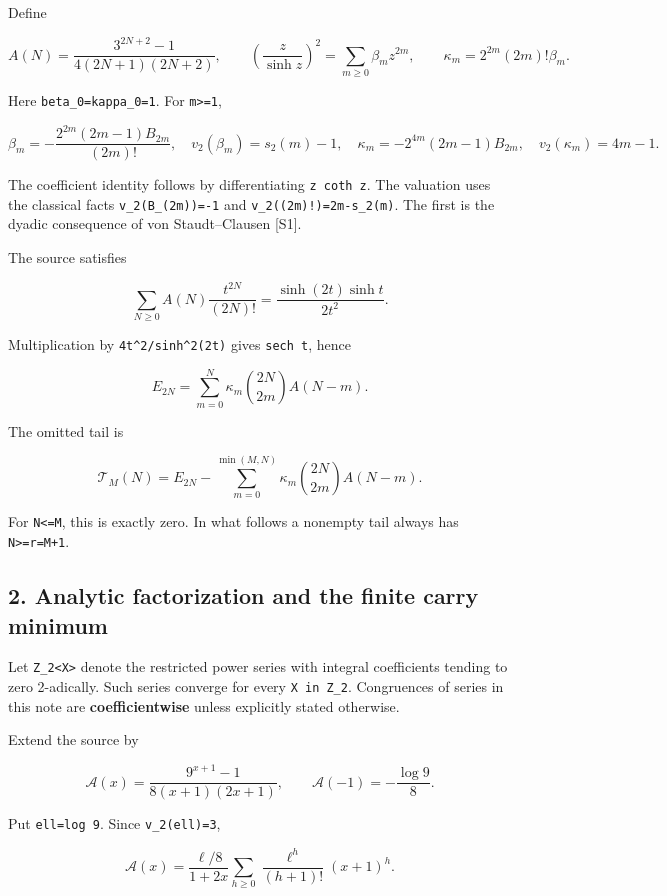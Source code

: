 \documentclass[11pt,letterpaper]{article}
\begin{document}
Define

\[
A(N)=\frac{3^{2N+2}-1}{4(2N+1)(2N+2)},
\qquad
\left(\frac z{\sinh z}\right)^2=\sum_{m\ge0}\beta_mz^{2m},
\qquad \kappa_m=2^{2m}(2m)!\beta_m.
\]

Here \texttt{beta\_0=kappa\_0=1}. For \texttt{m\textgreater{}=1},

\[
\beta_m=-\frac{2^{2m}(2m-1)B_{2m}}{(2m)!},
\quad v_2(\beta_m)=s_2(m)-1,
\quad \kappa_m=-2^{4m}(2m-1)B_{2m},
\quad v_2(\kappa_m)=4m-1. \tag{1.1}
\]

The coefficient identity follows by differentiating \texttt{z\ coth\ z}. The valuation uses the classical facts \texttt{v\_2(B\_(2m))=-1} and \texttt{v\_2((2m)!)=2m-s\_2(m)}. The first is the dyadic consequence of von Staudt--Clausen {[}S1{]}.

The source satisfies

\[
\sum_{N\ge0}A(N)\frac{t^{2N}}{(2N)!}
=\frac{\sinh(2t)\sinh t}{2t^2}.
\]

Multiplication by \texttt{4t\^{}2/sinh\^{}2(2t)} gives \texttt{sech\ t}, hence

\[
E_{2N}=\sum_{m=0}^{N}\kappa_m\binom{2N}{2m}A(N-m). \tag{1.2}
\]

The omitted tail is

\[
\mathcal T_M(N)=E_{2N}-\sum_{m=0}^{\min(M,N)}
\kappa_m\binom{2N}{2m}A(N-m).
\]

For \texttt{N\textless{}=M}, this is exactly zero. In what follows a nonempty tail always has \texttt{N\textgreater{}=r=M+1}.

\subsection{2. Analytic factorization and the finite carry minimum}\label{analytic-factorization-and-the-finite-carry-minimum}

Let \texttt{Z\_2\textless{}X\textgreater{}} denote the restricted power series with integral coefficients tending to zero 2-adically. Such series converge for every \texttt{X\ in\ Z\_2}. Congruences of series in this note are \textbf{coefficientwise} unless explicitly stated otherwise.

Extend the source by

\[
\mathscr A(x)=\frac{9^{x+1}-1}{8(x+1)(2x+1)},
\qquad \mathscr A(-1)=-\frac{\log9}{8}.
\]

Put \texttt{ell=log\ 9}. Since \texttt{v\_2(ell)=3},

\[
\mathscr A(x)=\frac{\ell/8}{1+2x}
\sum_{h\ge0}\frac{\ell^h}{(h+1)!}(x+1)^h. \tag{2.1}
\]
\end{document}
